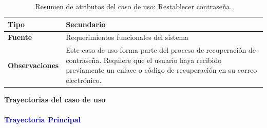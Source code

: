 \begin{table}[H]
\begin{tabular}{|l|p{10cm}|}
\textbf{Tipo} & Secundario \\ \hline

\textbf{Fuente} & Requerimientos funcionales del sistema \\ \hline

\textbf{Observaciones} & 
Este caso de uso forma parte del proceso de recuperación de contraseña. Requiere que el usuario haya recibido previamente un enlace o código de recuperación en su correo electrónico. \\ \hline

\end{tabular}
\caption{Resumen de atributos del caso de uso: Restablecer contraseña.}
\label{tab:cuG03RestablecerContrasena}
\end{table}


{\large {\textbf{Trayectorias del caso de uso}}}

\vspace{0.5em}
\paragraph{\textbf{\textcolor{blue}{Trayectoria Principal}}}


